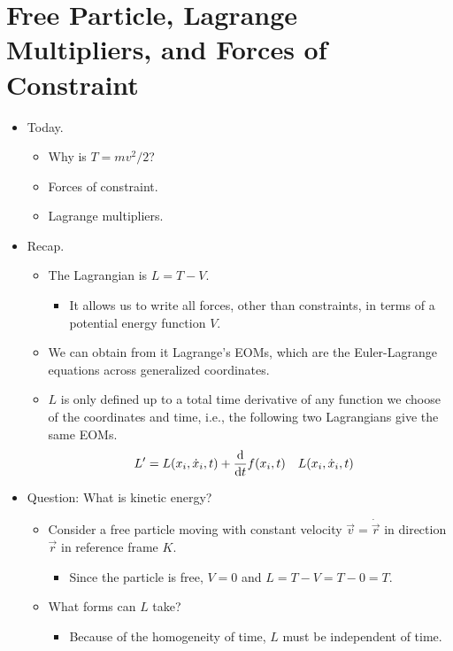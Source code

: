 \documentclass[../notes.tex]{subfiles}
\begin{document}
\section{Free Particle, Lagrange Multipliers, and Forces of Constraint}
\begin{itemize}
    \item {}Today.
    \begin{itemize}
        \item Why is $T=mv^2/2$?
        \item Forces of constraint.
        \item Lagrange multipliers.
    \end{itemize}
    \item Recap.
    \begin{itemize}
        \item The Lagrangian is $L=T-V$.
        \begin{itemize}
            \item It allows us to write all forces, other than constraints, in terms of a potential energy function $V$.
        \end{itemize}
        \item We can obtain from it Lagrange's EOMs, which are the Euler-Lagrange equations across generalized coordinates.
        \item $L$ is only defined up to a total time derivative of any function we choose of the coordinates and time, i.e., the following two Lagrangians give the same EOMs.
        \begin{align*}
            L' &= L(x_i,\dot{x}_i,t)+\dv{t}f(x_i,t)&
            &L(x_i,\dot{x}_i,t)
        \end{align*}
    \end{itemize}
    \item Question: What is kinetic energy?
    \begin{itemize}
        \item Consider a free particle moving with constant velocity $\vec{v}=\dot{\vec{r}}$ in direction $\vec{r}$ in reference frame $K$.
        \begin{itemize}
            \item Since the particle is free, $V=0$ and $L=T-V=T-0=T$.
        \end{itemize}
        \item What forms can $L$ take?
        \begin{itemize}
            \item Because of the homogeneity of time, $L$ must be independent of time.

\end{itemize}
\end{itemize}
\end{itemize}
\end{document}

